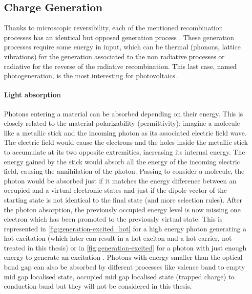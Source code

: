 	\subsection{Charge Generation}
	Thanks to microscopic reversibility, each of the mentioned recombination processes has an identical but opposed generation process \cite[81]{Nelson2003}.
	These generation processes require some energy in input, which can be thermal (phonons, lattice vibrations) for the generation associated to the non radiative processes or radiative for the reverse of the radiative recombination.
	This last case, named photogeneration, is the most interesting for photovoltaics.



		\paragraph{Light absorption}
		Photons entering a material can be absorbed depending on their energy.
		This is closely related to the material polarizability (permittivity): imagine a molecule like a metallic stick and the incoming photon as its associated electric field wave.
		The electric field would cause the electrons and the holes inside the metallic stick to accumulate at its two opposite extremities, increasing its internal energy.
		The energy gained by the stick would absorb all the energy of the incoming electric field, causing the annihilation of the photon.
		Passing to consider a molecule, the photon would be absorbed just if it matches the energy difference between an occupied and a virtual electronic states and just if the dipole vector of the starting state is not identical to the final state (and more selection rules).
		After the photon absorption, the previously occupied energy level is now missing one electron which has been promoted to the previously virtual state.
		This is represented in \cref{fig:generation-excited_hot} for a high energy photon generating a hot excitation  (which later can result in a hot exciton and a hot carrier, not treated in this thesis) or in \cref{fig:generation-excited} for a photon with just enough energy to generate an excitation .
		Photons with energy smaller than the optical band gap can also be absorbed by different processes like valence band to empty mid gap localised state, occupied mid gap localised state (trapped charge) to conduction band but they will not be considered in this thesis.
		
